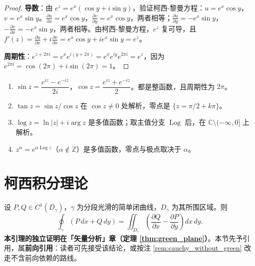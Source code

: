 \begin{proof}
\textbf{导数}：由 $e^z = e^x(\cos y + i\sin y)$，验证柯西-黎曼方程：$u = e^x\cos y$，$v = e^x\sin y$。$\frac{\partial u}{\partial x} = e^x\cos y$，$\frac{\partial v}{\partial y} = e^x\cos y$，两者相等；$\frac{\partial u}{\partial y} = -e^x\sin y$，$-\frac{\partial v}{\partial x} = -e^x\sin y$，两者相等。由柯西-黎曼方程，$e^z$ 复可导，且 $f'(z) = \frac{\partial u}{\partial x} + i\frac{\partial v}{\partial x} = e^x\cos y + ie^x\sin y = e^z$。

\textbf{周期性}：$e^{z+2\pi i} = e^x e^{i(y+2\pi)} = e^x e^{iy} e^{2\pi i} = e^z$，因为 $e^{2\pi i} = \cos(2\pi) + i\sin(2\pi) = 1$。
\end{proof}

\begin{example}[复初等函数的定义]\label{ex:elementary_complex_functions}
\begin{enumerate}[label=(\roman*)]
    \item $\sin z = \dfrac{e^{iz} - e^{-iz}}{2i}$，$\cos z = \dfrac{e^{iz} + e^{-iz}}{2}$。都是整函数，且周期性为 $2\pi$。
    \item $\tan z = \sin z / \cos z$ 在 $\cos z \neq 0$ 处解析，零点是 $\{z = \pi/2 + k\pi\}$。
    \item $\log z = \ln|z| + i\arg z$ 是多值函数；取主值分支 $\operatorname{Log}$ 后，在 $\mathbb{C} \setminus (-\infty, 0]$ 上解析。
    \item $z^\alpha = e^{\alpha \operatorname{Log} z}$（$\alpha \notin \mathbb{Z}$）是多值函数，零点与极点取决于 $\alpha$。
\end{enumerate}
\end{example}

\section{柯西积分理论}\label{sec:cauchy_theory}

\begin{lemma}\label{lem:green_forward}
设 $P, Q \in C^1(\overline{D_\gamma})$，$\gamma$ 为分段光滑的简单闭曲线，$D_\gamma$ 为其所围区域。则
\[
\oint_\gamma (P\,dx + Q\,dy) = \iint_{D_\gamma}\left( \frac{\partial Q}{\partial x} - \frac{\partial P}{\partial y} \right) dx\,dy .
\]
\textbf{本引理的独立证明在「矢量分析」章（定理 \ref{thm:green_plane}）}。本节先予引用，属\textbf{前向引用}：读者可先接受该结论，或按注 \ref{rem:cauchy_without_green} 改走不含前向依赖的路线。
\end{lemma}

